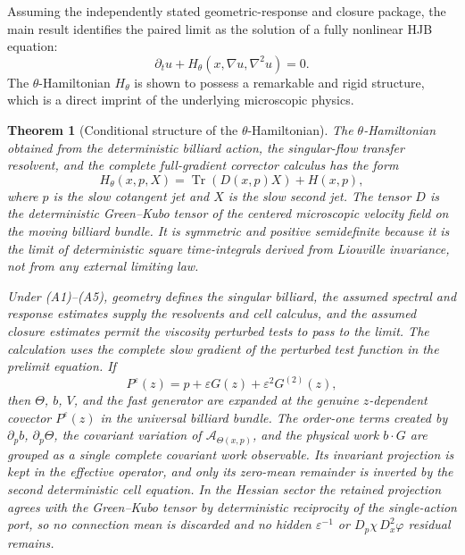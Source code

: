 \documentclass[12pt, letterpaper]{amsart}
\newcommand{\Acal}{\mathcal{A}}
\theoremstyle{plain}
\newtheorem{theorem}{Theorem}[section]
\theoremstyle{definition}
\theoremstyle{remark}
\begin{document}
Assuming the independently stated geometric-response and closure package, the
main result identifies the paired limit as the solution of a fully nonlinear
HJB equation:
\begin{equation}
    \partial_t u + H_{\theta}(x, \nabla u, \nabla^2 u) = 0.
\end{equation}
The $\theta$-Hamiltonian $H_{\theta}$ is shown to possess a remarkable and rigid structure, which is a direct imprint of the underlying microscopic physics.

\begin{theorem}[Conditional structure of the $\theta$-Hamiltonian]
\label{thm:intro_structure_corrected}
The $\theta$-Hamiltonian obtained from the deterministic billiard action, the
singular-flow transfer resolvent, and the complete full-gradient corrector
calculus has the form
\begin{equation}
    H_{\theta}(x,p,X)=\operatorname{Tr}(D(x,p)X)+H(x,p),
\end{equation}
where $p$ is the slow cotangent jet and $X$ is the slow second jet.  The tensor
$D$ is the deterministic Green--Kubo tensor of the centered microscopic velocity
field on the moving billiard bundle.  It is symmetric and positive semidefinite
because it is the limit of deterministic square time-integrals derived from
Liouville invariance, not from any external limiting law.

Under \textup{(A1)--(A5)}, geometry defines the singular billiard, the assumed
spectral and response estimates supply the resolvents and cell calculus, and
the assumed closure estimates permit the viscosity perturbed tests to pass to
the limit. The calculation uses the complete slow gradient of the perturbed test function in the
prelimit equation.  If
\begin{equation}
    P^\varepsilon(z)=p+\varepsilon G(z)+\varepsilon^2G^{(2)}(z),
\end{equation}
then $\Theta$, $b$, $V$, and the fast generator are expanded at the genuine
$z$-dependent covector $P^\varepsilon(z)$ in the universal billiard bundle.  The
order-one terms created by $\partial_p b$, $\partial_p\Theta$, the covariant
variation of $\Acal_{\Theta(x,p)}$, and the physical work $b\cdot G$ are grouped
as a single complete covariant work observable.  Its invariant projection is
kept in the effective operator, and only its zero-mean remainder is inverted by
the second deterministic cell equation.  In the Hessian sector the retained
projection agrees with the Green--Kubo tensor by deterministic reciprocity of the
single-action port, so no connection mean is discarded and no hidden
$\varepsilon^{-1}$ or $D_p\chi\,D_x^2\varphi$ residual remains.


\end{theorem}
\end{document}
